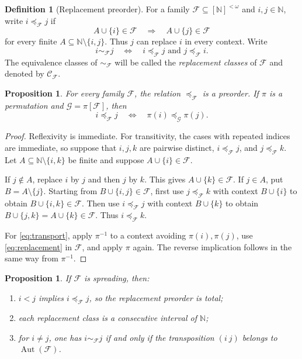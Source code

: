 \documentclass[11pt]{article}
\newtheorem{proposition}[theorem]{Proposition}
\theoremstyle{definition}
\newtheorem{definition}[theorem]{Definition}
\theoremstyle{remark}
\newcommand{\N}{\mathbb N}
\newcommand{\F}{\mathcal F}
\newcommand{\G}{\mathcal G}
\newcommand{\Ccal}{\mathcal C}
\newcommand{\Aut}{\operatorname{Aut}}
\begin{document}
\begin{definition}[Replacement preorder]\label{def:replacement}
For a family $\F\subseteq[\N]^{<\omega}$ and $i,j\in\N$, write
$i\preccurlyeq_{\F}j$ if
\[
  A\cup\{i\}\in\F\quad\Longrightarrow\quad A\cup\{j\}\in\F
  \tag{2.1}\label{eq:replacement}
\]
for every finite $A\subseteq\N\setminus\{i,j\}$.  Thus $j$ can replace $i$
in every context.  Write
\[
  i\sim_{\F}j
  \quad\Longleftrightarrow\quad
  i\preccurlyeq_{\F}j\text{ and }j\preccurlyeq_{\F}i.
\]
The equivalence classes of $\sim_{\F}$ will be called the
\emph{replacement classes} of $\F$ and denoted by $\Ccal_{\F}$.
\end{definition}

\begin{proposition}\label{prop:preorder}
For every family $\F$, the relation $\preccurlyeq_{\F}$ is a preorder.  If
$\pi$ is a permutation and $\G=\pi[\F]$, then
\[
  i\preccurlyeq_{\F}j
  \quad\Longleftrightarrow\quad
  \pi(i)\preccurlyeq_{\G}\pi(j).
  \tag{2.2}\label{eq:transport}
\]
\end{proposition}

\begin{proof}
Reflexivity is immediate.  For transitivity, the cases with repeated indices
are immediate, so suppose that $i,j,k$ are pairwise distinct,
$i\preccurlyeq_{\F}j$, and $j\preccurlyeq_{\F}k$.  Let
$A\subseteq\N\setminus\{i,k\}$ be finite and suppose
$A\cup\{i\}\in\F$.

If $j\notin A$, replace $i$ by $j$ and then $j$ by $k$.  This gives
$A\cup\{k\}\in\F$.  If $j\in A$, put $B=A\setminus\{j\}$.  Starting from
$B\cup\{i,j\}\in\F$, first use $j\preccurlyeq_{\F}k$ with context
$B\cup\{i\}$ to obtain $B\cup\{i,k\}\in\F$.  Then use
$i\preccurlyeq_{\F}j$ with context $B\cup\{k\}$ to obtain
$B\cup\{j,k\}=A\cup\{k\}\in\F$.  Thus
$i\preccurlyeq_{\F}k$.

For \eqref{eq:transport}, apply $\pi^{-1}$ to a context avoiding
$\pi(i),\pi(j)$, use \eqref{eq:replacement} in $\F$, and apply $\pi$ again.
The reverse implication follows in the same way from $\pi^{-1}$.
\end{proof}

\begin{proposition}\label{prop:spreading-structure}
If $\F$ is spreading, then:
\begin{enumerate}[label=\textup{(\roman*)},leftmargin=2.2em]
  \item $i<j$ implies $i\preccurlyeq_{\F}j$, so the replacement preorder is
        total;
  \item each replacement class is a consecutive interval of $\N$;
  \item for $i\ne j$, one has $i\sim_{\F}j$ if and only if the transposition
        $(i\ j)$ belongs to $\Aut(\F)$.
\end{enumerate}
\end{proposition}
\end{document}
